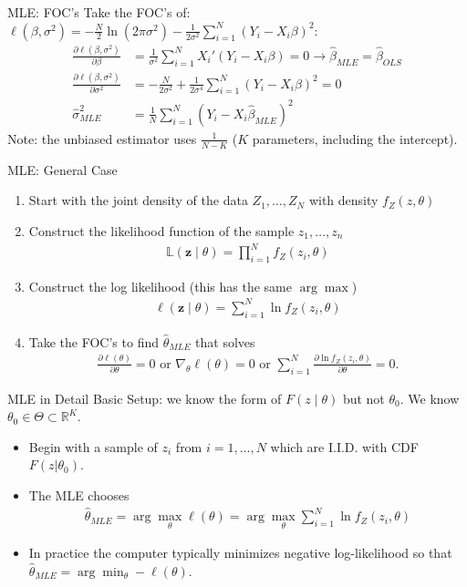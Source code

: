 \documentclass[aspectratio=169,11pt]{beamer}
\begin{document}
\begin{frame}{MLE: FOC's}
Take the FOC's of: 
$\ell(\beta,\sigma^2) = -\frac{N}{2} \ln (2 \pi \sigma^2) - \frac{1}{2 \sigma^2} \sum_{i=1}^N(Y_i - X_i \beta)^2
$:
\begin{align*} 
\frac{ \partial \ell(\beta,\sigma^2) }{\partial \beta}&= \frac{1}{ \sigma^2}\sum_{i=1}^N X_i'(Y_i - X_i \beta) = 0 \rightarrow \widehat{\beta}_{MLE}= \widehat{\beta}_{OLS}\\ 
\frac{ \partial \ell(\beta,\sigma^2) }{\partial \sigma^2}&= -\frac{N}{2 \sigma^2}  +  \frac{1}{2 \sigma^4} \sum_{i=1}^N(Y_i - X_i \beta)^2 = 0 \\
\widehat{\sigma}^2_{MLE} &= \frac{1}{N} \sum_{i=1}^N (Y_i - X_i \widehat{\beta}_{MLE})^2
\end{align*}
Note: the unbiased estimator uses $\frac{1}{N-K}$ ($K$ parameters, including the intercept).
\end{frame}

\begin{frame}{MLE: General Case}
\begin{enumerate}
\item Start with the \alert{joint density of the data} $Z_1,\ldots,Z_N$ with density $f_Z(z,\theta)$
\item Construct the likelihood function of the sample $z_1,\ldots,z_n$
\begin{align*}
\mathbb{L}(\mathbf{z} \mid  \theta) = \prod_{i=1}^N f_Z(z_i,\theta)
\end{align*}
\item Construct the \alert{log likelihood} (this has the same $\arg \max$)
\begin{align*}
\ell(\mathbf{z} \mid \theta) = \sum_{i=1}^N \ln f_Z(z_i,\theta)
\end{align*}
\item Take the FOC's to find $\widehat{\theta}_{MLE}$ that solves
\begin{align*}
\frac{\partial \ell(\theta)}{\partial \theta} =0 \text{ or  } \nabla_{\theta} \ell(\theta) =0 \text{ or  } \sum_{i=1}^N \frac{\partial \ln f_Z(z_i,\theta) }{\partial \theta}  =0.
\end{align*}
\end{enumerate}
\end{frame}

\begin{frame}{MLE in Detail}
Basic Setup: we know the form of $F(z \mid \theta)$ but not $\theta_0$. We know $\theta_0 \in \Theta \subset \mathbb{R}^K$.
\begin{itemize}
\item Begin with a sample of $z_i$ from $i=1,\ldots,N$ which are I.I.D. with CDF $F(z|\theta_0)$.
\item The MLE chooses
\begin{align*}
\widehat{\theta}_{MLE} = \arg \max_{\theta} \ell(\theta) = \arg \max_{\theta} \sum_{i=1}^N \ln f_Z(z_i,\theta)
\end{align*}
\item In practice the computer typically \alert{minimizes negative log-likelihood} so that $\widehat{\theta}_{MLE} = \arg \min_{\theta} - \ell(\theta)$.
\end{itemize}
\end{frame}
\end{document}
